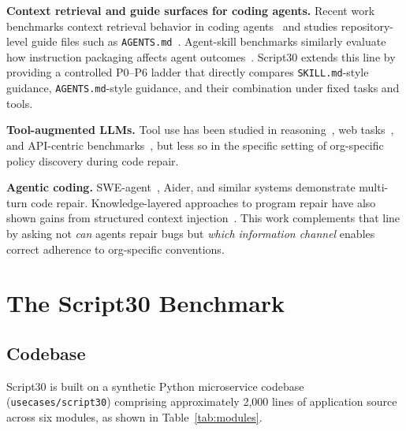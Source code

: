 \documentclass[10pt,a4paper,twocolumn]{article}
\begin{document}
\textbf{Context retrieval and guide surfaces for coding agents.}
Recent work benchmarks context retrieval behavior in coding
agents~\citep{cai2026contextbench} and studies repository-level guide files
such as \texttt{AGENTS.md}~\citep{gloaguen2026agentsmd}.
Agent-skill benchmarks similarly evaluate how instruction packaging affects
agent outcomes~\citep{li2026skillsbench}.
Script30 extends this line by providing a controlled P0--P6 ladder that
directly compares \texttt{SKILL.md}-style guidance, \texttt{AGENTS.md}-style
guidance, and their combination under fixed tasks and tools.

\textbf{Tool-augmented LLMs.}
Tool use has been studied in reasoning~\citep{schick2023toolformer}, web
tasks~\citep{yao2023react}, and API-centric
benchmarks~\citep{li2023apibank}, but less so in the specific setting of
org-specific policy discovery during code repair.

\textbf{Agentic coding.}
SWE-agent~\citep{yang2024sweagent}, Aider, and similar systems demonstrate
multi-turn code repair.
Knowledge-layered approaches to program repair have also shown gains from
structured context injection~\citep{ehsani2025hierarchical}.
This work complements that line by asking not \emph{can} agents repair bugs
but \emph{which information channel} enables correct adherence to
org-specific conventions.

\section{The Script30 Benchmark}
\label{sec:benchmark}

\subsection{Codebase}
\label{sec:codebase}

Script30 is built on a synthetic Python microservice codebase
(\texttt{usecases/script30}) comprising approximately 2,000 lines of
application source across six modules, as shown in
Table~\ref{tab:modules}.
\end{document}
